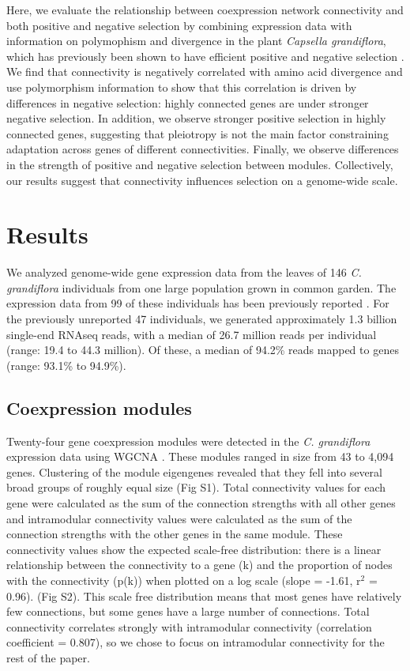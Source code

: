 Here, we evaluate the relationship between coexpression network connectivity and both positive and negative selection by combining  expression data with information on polymophism and divergence in the plant \textit{Capsella grandiflora}, which has previously been shown to have efficient positive and negative selection \citep{Williamson2014-tf}. We find that connectivity is negatively correlated with amino acid divergence and use polymorphism information to show that this correlation is driven by differences in negative selection: highly connected genes are under stronger negative selection. In addition, we observe stronger positive selection in highly connected genes, suggesting that pleiotropy is not the main factor constraining adaptation across genes of different connectivities. Finally, we observe differences in the strength of positive and negative selection between modules. Collectively, our results suggest that connectivity influences selection on a genome-wide scale.

\section{Results}

We analyzed genome-wide gene expression data from the leaves of 146 \textit{C. grandiflora} individuals from one large population grown in common garden. The expression data from 99 of these individuals has been previously reported \citep{Josephs2015-nx}. For the previously unreported 47 individuals, we generated approximately 1.3 billion single-end RNAseq reads, with a median of 26.7 million reads per individual (range: 19.4 to 44.3 million). Of these, a median of 94.2\% reads mapped to genes (range: 93.1\% to 94.9\%).

\subsection{Coexpression modules}
Twenty-four gene coexpression modules were detected in the \textit{C. grandiflora} expression data using WGCNA \citep{langfelder2008}. These modules ranged in size from 43 to 4,094 genes. Clustering of the module eigengenes revealed that they fell into several broad groups of roughly equal size (Fig S1). Total connectivity values for each gene were calculated as the sum of the connection strengths with all other genes and intramodular connectivity values were calculated as the sum of the connection strengths with the other genes in the same module. These connectivity values show the expected scale-free distribution: there is a linear relationship between the connectivity to a gene (k) and the proportion of nodes with the connectivity (p(k)) when plotted on a log scale (slope = -1.61, r$^{2}$ = 0.96). (Fig S2). This scale free distribution means that most genes have relatively few connections, but some genes have a large number of connections. Total connectivity correlates strongly with intramodular connectivity (correlation coefficient = 0.807), so we chose to focus on intramodular connectivity for the rest of the paper.

